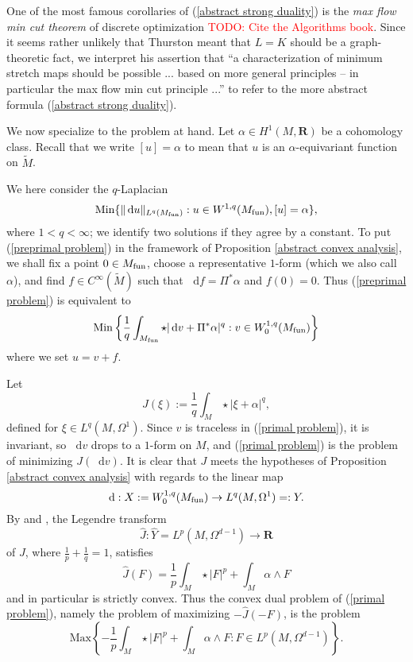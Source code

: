 \documentclass[reqno,11pt]{amsart}
\newcommand{\RR}{\mathbf{R}}
\newcommand*\dif{\mathop{}\!\mathrm{d}}
\newcommand{\Min}{\mathrm{Min}}
\newcommand{\Max}{\mathrm{Max}}
\newcommand{\dfn}[1]{\emph{#1}\index{#1}}
\theoremstyle{definition}
\numberwithin{equation}{section}
\newcommand\todo[1]{\textcolor{red}{TODO: #1}}
\begin{document}
One of the most famous corollaries of (\ref{abstract strong duality}) is the \dfn{max flow min cut theorem} of discrete optimization \todo{Cite the Algorithms book}.
Since it seems rather unlikely that Thurston meant that $L = K$ should be a graph-theoretic fact, we interpret his assertion that ``a characterization of minimum stretch maps should be possible ... based on more general principles -- in particular the max flow min cut principle ...'' to refer to the more abstract formula (\ref{abstract strong duality}).

We now specialize to the problem at hand.
Let $\alpha \in H^1(M, \RR)$ be a cohomology class.
Recall that we write $[u] = \alpha$ to mean that $u$ is an $\alpha$-equivariant function on $\tilde M$.

We here consider the $q$-Laplacian
\begin{equation}\label{preprimal problem}
	\Min\{\|\dif u\|_{L^q(M_{\rm fun})}: u \in W^{1, q}(M_{\rm fun}), [u] = \alpha\},
\end{equation}
where $1 < q < \infty$; we identify two solutions if they agree by a constant.
To put (\ref{preprimal problem}) in the framework of Proposition \ref{abstract convex analysis}, we shall fix a point $0 \in M_{\rm fun}$, choose a representative $1$-form (which we also call $\alpha$), and find $f \in C^\infty(\tilde M)$ such that $\dif f = \Pi^*\alpha$ and $f(0) = 0$.
Thus (\ref{preprimal problem}) is equivalent to
\begin{equation}\label{primal problem}
	\Min\left\{\frac{1}{q} \int_{M_{\rm fun}} \star|\dif v + \Pi^* \alpha|^q: v \in W^{1, q}_0(M_{\rm fun})\right\}
\end{equation}
where we set $u = v + f$.

Let
$$J(\xi) := \frac{1}{q} \int_M \star|\xi + \alpha|^q,$$
defined for $\xi \in L^q(M, \Omega^1)$.
Since $v$ is traceless in (\ref{primal problem}), it is invariant, so $\dif v$ drops to a $1$-form on $M$, and (\ref{primal problem}) is the problem of minimizing $J(\dif v)$.
It is clear that $J$ meets the hypotheses of Proposition \ref{abstract convex analysis} with regards to the linear map
\begin{equation}\label{derivative on traceless}
\dif: X := W^{1, q}_0(M_{\rm fun}) \to L^q(M, \Omega^1) =: Y.
\end{equation}
By \cite[Chapter I, (4.9)]{Ekeland99} and \cite[Chapter I, Remark 4.1]{Ekeland99}, the Legendre transform
$$\hat J: \hat Y = L^p(M, \Omega^{d - 1}) \to \RR$$
of $J$, where $\frac{1}{p} + \frac{1}{q} = 1$, satisfies
\begin{equation}\label{Legendre transform}
\hat J(F) = \frac{1}{p} \int_M \star |F|^p + \int_M \alpha \wedge F
\end{equation}
and in particular is strictly convex.
Thus the convex dual problem of (\ref{primal problem}), namely the problem of maximizing $-\hat J(-F)$, is the problem
\begin{equation}\label{predual problem}
\Max\left\{- \frac{1}{p} \int_M \star |F|^p + \int_M \alpha \wedge F: F \in L^p(M, \Omega^{d - 1})\right\}.
\end{equation}
\end{document}

